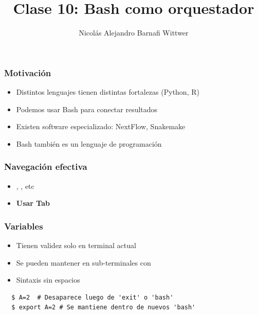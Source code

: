 \documentclass[14pt,aspectratio=169,xcolor=dvipsnames]{beamer}
\title[short title]{Clase 10: Bash como orquestador}
\subtitle{}
\author[NA Barnafi] {Nicolás Alejandro Barnafi Wittwer}
\institute[UC|CMM] 
{
    Pontificia Universidad Católica de Chile \\
    Centro de Modelamiento Matemático
}
\date{}
\begin{document}
\begin{frame}
    \maketitle
\end{frame}
\begin{frame}\frametitle{Motivación}
    \begin{itemize}
        \item Distintos lenguajes tienen distintas fortalezas (Python, R)
        \item Podemos usar Bash para conectar resultados
        \item Existen software especializado: NextFlow, Snakemake
        \item Bash también es un lenguaje de programación
    \end{itemize}
\end{frame}
\begin{frame}\frametitle{Navegación efectiva}
    \begin{itemize}
        \item {}, , etc
        \item \textbf{Usar Tab}
    \end{itemize}

\end{frame}
\begin{frame}[fragile]\frametitle{Variables}
    \begin{itemize}
        \item Tienen validez solo en terminal actual
        \item Se pueden mantener en sub-terminales con 
        \item Sintaxis sin espacios
    \end{itemize}
    
    \begin{verbatim}
  $ A=2  # Desaparece luego de 'exit' o 'bash'
  $ export A=2 # Se mantiene dentro de nuevos 'bash'
    \end{verbatim}
\end{frame}
\end{document}
